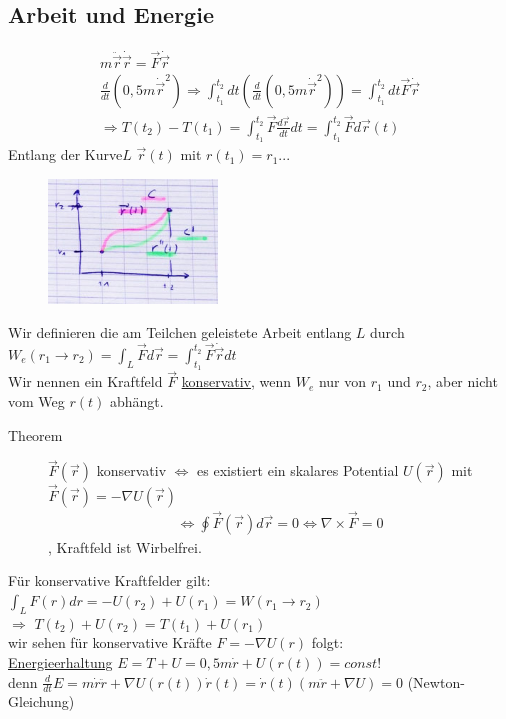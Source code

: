 \subsection{Arbeit und Energie}
\begin{align*}
m\ddot{\vec{r}}\dot{\vec{r}}=\vec{F}\dot{\vec{r}}\\
\frac{d}{dt}(0,5m\dot{\vec{r}}^2)	\Rightarrow\int_{t_1}^{t_2}dt(\frac{d}{dt}(0,5m\dot{\vec{r}}^2))=\int_{t_1}^{t_2}dt\vec{F}\dot{\vec{r}}\\
\Rightarrow T(t_2)-T(t_1)=\int_{t_1}^{t_2}\vec{F}\frac{d\vec{r}}{dt}dt =\int_{t_1}^{t_2}\vec{F}d\vec{r}(t)
\end{align*}
Entlang der Kurve$L$ $\vec{r}(t)$ mit $r(t_1)=r_1...$
\begin{figure}[h]
\begin{center}
\includegraphics[width=0.4\textwidth]{Skizzen/Anhang2.jpg}
\end{center}
\caption{}
\end{figure}
Wir definieren die am Teilchen geleistete Arbeit entlang $L$ durch $W_e(r_1\rightarrow r_2)=\int_L \vec{F}d\vec{r}=\int_{t_1}^{t_2}\vec{F}\dot{\vec{r}}dt$\\
Wir nennen ein Kraftfeld $\vec{F}$ \underline{konservativ}, wenn $W_e$ nur von $r_1$ und $r_2$, aber nicht vom Weg $r(t)$ abhängt.\\
\begin{description}
\item[Theorem] $\vec{F}(\vec{r})$ konservativ $\Leftrightarrow$ es existiert ein skalares Potential $U(\vec{r})$ mit $\vec{F}(\vec{r})=-\nabla U(\vec{r})$
\begin{align*}
\Leftrightarrow \oint\vec{F}(\vec{r})d\vec{r}=0 \Leftrightarrow\nabla \times\vec{F}=0
\end{align*}
, Kraftfeld ist Wirbelfrei.
\end{description}
Für konservative Kraftfelder gilt: $\int_L F(r)dr=-U(r_2)+U(r_1)=W(r_1\rightarrow r_2)$\\
$\Rightarrow$ $T(t_2)+U(r_2)=T(t_1)+U(r_1)$\\
wir sehen für konservative Kräfte $F=-\nabla U(r)$ folgt:\\
\underline{Energieerhaltung} $E=T+U=0,5m\dot{r}+U(r(t))=const$!\\
denn $\frac{d}{dt}E=m\dot{r}\ddot{r}+\nabla U(r(t))\dot{r}(t)=\dot{r}(t)(m\ddot{r}+\nabla U)=0$ (Newton-Gleichung)
